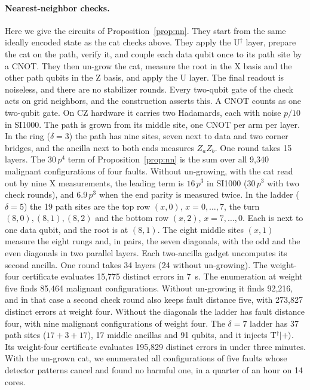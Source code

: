 \documentclass[aps,prl,reprint,twocolumn,amsmath,amssymb,floatfix,nofootinbib,superscriptaddress]{revtex4-2}
\theoremstyle{definition}
\theoremstyle{remark}
\begin{document}
\paragraph*{Nearest-neighbor checks.}
Here we give the circuits of Proposition~\ref{prop:nn}. They start from the same ideally encoded state as the cat checks above. They apply the U$^\dagger$ layer, prepare the cat on the path, verify it, and couple each data qubit once to its path site by a CNOT. They then un-grow the cat, measure the root in the X basis and the other path qubits in the Z basis, and apply the U layer. The final readout is noiseless, and there are no stabilizer rounds. Every two-qubit gate of the check acts on grid neighbors, and the construction asserts this. A CNOT counts as one two-qubit gate. On CZ hardware it carries two Hadamards, each with noise $p/10$ in SI1000. The path is grown from its middle site, one CNOT per arm per layer. In the ring ($\delta=3$) the path has nine sites, seven next to data and two corner bridges, and the ancilla next to both ends measures $Z_aZ_b$. One round takes 15 layers. The $30\,p^4$ term of Proposition~\ref{prop:nn} is the sum over all 9,340 malignant configurations of four faults. Without un-growing, with the cat read out by nine X measurements, the leading term is $16\,p^3$ in SI1000 ($30\,p^3$ with two check rounds), and $6.9\,p^3$ when the end parity is measured twice. In the ladder ($\delta=5$) the 19 path sites are the top row $(x,0)$, $x=0,\dots,7$, the turn $(8,0),(8,1),(8,2)$ and the bottom row $(x,2)$, $x=7,\dots,0$. Each is next to one data qubit, and the root is at $(8,1)$. The eight middle sites $(x,1)$ measure the eight rungs and, in pairs, the seven diagonals, with the odd and the even diagonals in two parallel layers. Each two-ancilla gadget uncomputes its second ancilla. One round takes 34 layers (24 without un-growing). The weight-four certificate evaluates 15,775 distinct errors in 7~s. The enumeration at weight five finds 85,464 malignant configurations. Without un-growing it finds 92,216, and in that case a second check round also keeps fault distance five, with 273,827 distinct errors at weight four. Without the diagonals the ladder has fault distance four, with nine malignant configurations of weight four. The $\delta=7$ ladder has 37 path sites ($17+3+17$), 17 middle ancillas and 91 qubits, and it injects T$^\dagger|{+}\rangle$. Its weight-four certificate evaluates 195,829 distinct errors in under three minutes. With the un-grown cat, we enumerated all configurations of five faults whose detector patterns cancel and found no harmful one, in a quarter of an hour on 14 cores.
\end{document}

